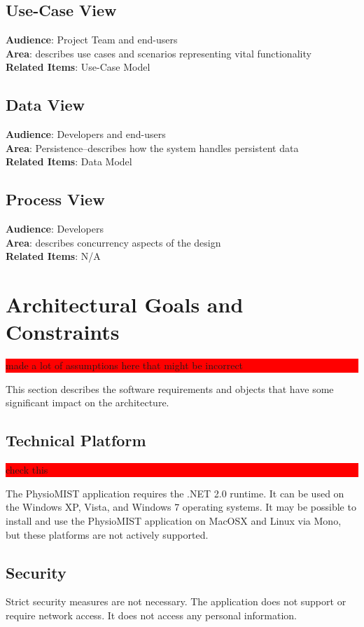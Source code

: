 \documentclass{article}
\newcommand{\todo}[1]{\colorbox{red}{\begin{minipage}{\textwidth}{#1}\end{minipage}}}
\begin{document}
\subsection{Use-Case View}
\textbf{Audience}: Project Team and end-users\\
\textbf{Area}: describes use cases and scenarios representing vital functionality\\
\textbf{Related Items}: Use-Case Model
\subsection{Data View}
\textbf{Audience}: Developers and end-users\\
\textbf{Area}: Persistence--describes how the system handles persistent data\\
\textbf{Related Items}: Data Model
\subsection{Process View}
\textbf{Audience}: Developers\\
\textbf{Area}: describes concurrency aspects of the design\\
\textbf{Related Items}: N/A

\section{Architectural Goals and Constraints}
\todo{made a lot of assumptions here that might be incorrect}
This section describes the software requirements and objects that have some significant impact on the architecture.
\subsection{Technical Platform}
\todo{check this}
The PhysioMIST application requires the .NET 2.0 runtime. It can be used on the Windows XP, Vista, and Windows 7 operating systems. It may be possible to install and use the PhysioMIST application on MacOSX and Linux via Mono, but these platforms are not actively supported.
\subsection{Security}
Strict security measures are not necessary. The application does not support or require network access. It does not access any personal information.
\end{document}
